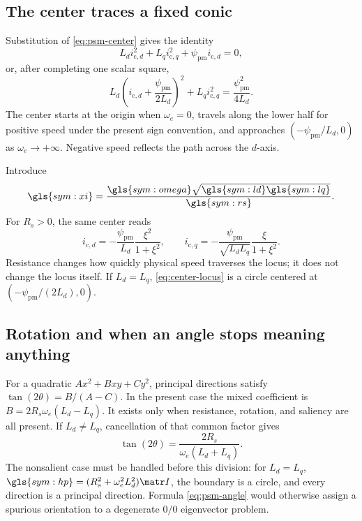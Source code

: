 \subsection{The center traces a fixed conic}

Substitution of \cref{eq:psm-center} gives the identity
\begin{equation}
 L_di_{\mathrm c,d}^2+L_qi_{\mathrm c,q}^2
 +\psi_{\mathrm{pm}}i_{\mathrm c,d}=0,
 \label{eq:center-locus-raw}
\end{equation}
or, after completing one scalar square,
\begin{equation}
 \boxed{L_d\left(i_{\mathrm c,d}+\frac{\psi_{\mathrm{pm}}}{2L_d}\right)^2
 +L_qi_{\mathrm c,q}^2=\frac{\psi_{\mathrm{pm}}^2}{4L_d}.}
 \label{eq:center-locus}
\end{equation}
The center starts at the origin when \(\omega_e=0\), travels along the lower
half for positive speed under the present sign convention, and approaches
\((-\psi_{\mathrm{pm}}/L_d,0)\) as \(\omega_e\to+\infty\). Negative speed
reflects the path across the \(d\)-axis.

Introduce
\begin{equation}
 \gls{sym:xi}=\frac{\gls{sym:omega}\sqrt{\gls{sym:ld}\gls{sym:lq}}}
 {\gls{sym:rs}}.
\end{equation}
For \(R_s>0\), the same center reads
\begin{equation}
 i_{\mathrm c,d}=-\frac{\psi_{\mathrm{pm}}}{L_d}
 \frac{\xi^2}{1+\xi^2},\qquad
 i_{\mathrm c,q}=-\frac{\psi_{\mathrm{pm}}}{\sqrt{L_dL_q}}
 \frac{\xi}{1+\xi^2}.
 \label{eq:center-dimensionless}
\end{equation}
Resistance changes how quickly physical speed traverses the locus; it does not
change the locus itself. If \(L_d=L_q\), \cref{eq:center-locus} is a circle
centered at \((-\psi_{\mathrm{pm}}/(2L_d),0)\).



\subsection{Rotation and when an angle stops meaning anything}

For a quadratic \(Ax^2+Bxy+Cy^2\), principal directions satisfy
\(\tan(2\theta)=B/(A-C)\). In the present case the mixed coefficient is
\(B=2R_s\omega_e(L_d-L_q)\). It exists only when resistance, rotation, and
saliency are all present. If \(L_d\neq L_q\), cancellation of that common
factor gives
\begin{equation}
 \boxed{\tan(2\theta)=\frac{2R_s}{\omega_e(L_d+L_q)}.}
 \label{eq:psm-angle}
\end{equation}
The nonsalient case must be handled before this division: for \(L_d=L_q\),
\(\gls{sym:hp}=(R_s^2+\omega_e^2L_d^2)\matr I\), the boundary is a circle,
and every direction is a principal direction. Formula
\cref{eq:psm-angle} would otherwise assign a spurious orientation to a
degenerate \(0/0\) eigenvector problem.

